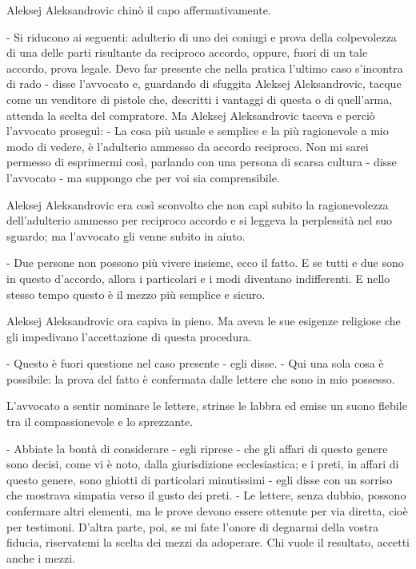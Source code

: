 Aleksej Aleksandrovic chinò il capo affermativamente. 

- Si riducono ai seguenti: adulterio di uno dei coniugi e prova della colpevolezza di una delle parti risultante da reciproco accordo, oppure, fuori di un tale accordo, prova legale. Devo far presente che nella pratica l'ultimo caso s'incontra di rado - disse l'avvocato e, guardando di sfuggita Aleksej Aleksandrovic, tacque come un venditore di pistole che, descritti i vantaggi di questa o di quell'arma, attenda la scelta del compratore. Ma Aleksej Aleksandrovic taceva e perciò l'avvocato proseguì: - La cosa più usuale e semplice e la più ragionevole a mio modo di vedere, è l'adulterio ammesso da accordo reciproco. Non mi sarei permesso di esprimermi così, parlando con una persona di scarsa cultura - disse l'avvocato - ma suppongo che per voi sia comprensibile. 

Aleksej Aleksandrovic era così sconvolto che non capì subito la ragionevolezza dell'adulterio ammesso per reciproco accordo e si leggeva la perplessità nel suo sguardo; ma l'avvocato gli venne subito in aiuto. 

- Due persone non possono più vivere insieme, ecco il fatto. E se tutti e due sono in questo d'accordo, allora i particolari e i modi diventano indifferenti. E nello stesso tempo questo è il mezzo più semplice e sicuro. 

Aleksej Aleksandrovic ora capiva in pieno. Ma aveva le sue esigenze religiose che gli impedivano l'accettazione di questa procedura. 

- Questo è fuori questione nel caso presente - egli disse. - Qui una sola cosa è possibile: la prova del fatto è confermata dalle lettere che sono in mio possesso. 

L'avvocato a sentir nominare le lettere, strinse le labbra ed emise un suono flebile tra il compassionevole e lo sprezzante. 

- Abbiate la bontà di considerare - egli riprese - che gli affari di questo genere sono decisi, come vi è noto, dalla giurisdizione ecclesiastica; e i preti, in affari di questo genere, sono ghiotti di particolari minutissimi - egli disse con un sorriso che mostrava simpatia verso il gusto dei preti. - Le lettere, senza dubbio, possono confermare altri elementi, ma le prove devono essere ottenute per via diretta, cioè per testimoni. D'altra parte, poi, se mi fate l'onore di degnarmi della vostra fiducia, riservatemi la scelta dei mezzi da adoperare. Chi vuole il resultato, accetti anche i mezzi. 

